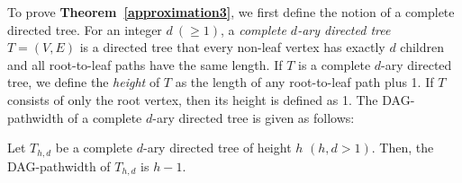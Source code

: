 \documentclass[runningheads]{llncs}
\theoremstyle{plain}
\theoremstyle{definition}
\begin{document}
To prove \textbf{Theorem~\ref{approximation3}}, we first define the notion of a complete directed tree. For an integer $d~(\geq 1)$, a \emph{complete $d$-ary directed tree} $T=(V, E)$ is a directed tree that every non-leaf vertex has exactly $d$ children and all root-to-leaf paths have the same length. If $T$ is a complete $d$-ary directed tree, we define the \emph{height} of $T$ as the length of any root-to-leaf path plus 1. If $T$ consists of only the root vertex, then its height is defined as 1. The DAG-pathwidth of a complete $d$-ary directed tree is given as follows: 

\begin{lemma}\label{comp_tree}
    Let $T_{h, d}$ be a complete $d$-ary directed tree of height $h$ $(h, d > 1)$. Then, the DAG-pathwidth of $T_{h, d}$ is $h-1$.
\end{lemma}
\end{document}
